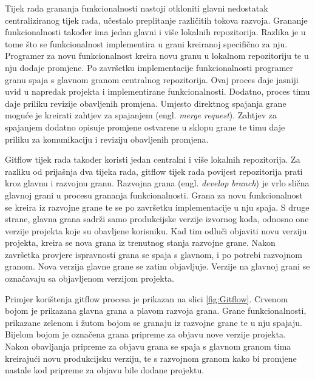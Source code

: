 \documentclass[times, utf8, diplomski, numeric]{fer}
\newcommand{\eng}[1]{(engl. \textit{#1})}
\begin{document}
Tijek rada grananja funkcionalnosti nastoji otkloniti glavni nedostatak centraliziranog tijek rada, učestalo preplitanje različitih tokova razvoja. Grananje funkcionalnosti također ima jedan glavni i više lokalnih repozitorija. Razlika je u tome što se funkcionalnost implementira u grani kreiranoj specifično za nju. Programer za novu funkcionalnost kreira novu granu u lokalnom repozitoriju te u nju dodaje promjene. Po završetku implementacije funkcionalnosti programer granu spaja s glavnom granom centralnog repozitorija. Ovaj proces daje jasniji uvid u napredak projekta i implementirane funkcionalnosti. Dodatno, proces timu daje priliku revizije obavljenih promjena. Umjesto direktnog spajanja grane moguće je kreirati zahtjev za spajanjem \eng{merge request}. Zahtjev za spajanjem dodatno opisuje promjene ostvarene u sklopu grane te timu daje priliku za komunikaciju i reviziju obavljenih promjena.

Gitflow tijek rada također koristi jedan centralni i više lokalnih repozitorija. Za razliku od prijašnja dva tijeka rada, gitflow tijek rada povijest repozitorija prati kroz glavnu i razvojnu granu. Razvojna grana \eng{develop branch} je vrlo slična glavnoj grani u procesu grananja funkcionalnosti. Grana za novu funkcionalnost se kreira iz razvojne grane te se po završetku implementacije u nju spaja. S druge strane, glavna grana sadrži samo produkcijske verzije izvornog koda, odnosno one verzije projekta koje su obavljene korisniku. Kad tim odluči objaviti novu verziju projekta, kreira se nova grana iz trenutnog stanja razvojne grane. Nakon završetka provjere ispravnosti grana se spaja s glavnom, i po potrebi razvojnom granom. Nova verzija glavne grane se zatim objavljuje. Verzije na glavnoj grani se označavaju sa objavljenom verzijom projekta.

Primjer korištenja gitflow procesa je prikazan na slici \ref{fig:Gitflow}. Crvenom bojom je prikazana glavna grana a plavom razvoja grana. Grane funkcionalnosti, prikazane zelenom i žutom bojom se granaju iz razvojne grane te u nju spajaju. Bijelom bojom je označena grana pripreme za objavu nove verzije projekta. Nakon obavljanja pripreme za objavu grana se spaja s glavnom granom tima kreirajući novu produkcijsku verziju, te s razvojnom granom kako bi promjene nastale kod pripreme za objavu bile dodane projektu.
\end{document}
